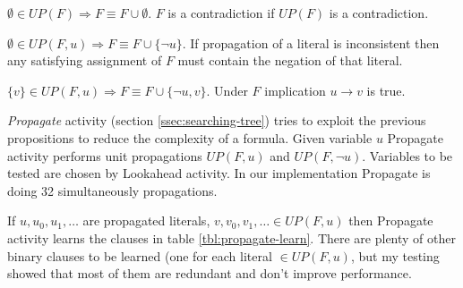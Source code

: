 \begin{myprop}
  $\emptyset \in UP(F) \Rightarrow F \equiv F \cup \emptyset$. $F$ is a
  contradiction if $UP(F)$ is a contradiction.
\end{myprop}

\begin{myprop}
  $\emptyset \in UP(F, u) \Rightarrow F \equiv F \cup \{\neg u\}$. If propagation
  of a literal is inconsistent then any satisfying assignment of $F$
  must contain the negation of that literal.
\end{myprop}

\begin{myprop}
  $\{ v \} \in UP(F, u) \Rightarrow F \equiv F \cup \{\neg u, v\}$. Under $F$
  implication $u \rightarrow v$ is true.
\end{myprop}

\emph{Propagate} activity (section \ref{ssec:searching-tree}) tries to exploit
the previous propositions to reduce the complexity of a formula.
Given variable $u$ Propagate activity performs unit propagations $UP(F, u)$
and $UP(F, \neg u)$. Variables to be tested are chosen by Lookahead
activity. In our implementation Propagate is doing 32 simultaneously
propagations. 

If $u, u_0, u_1, \ldots$ are propagated literals, $v, v_0, v_1,
\ldots \in UP(F, u)$ then Propagate activity learns the clauses in table
\ref{tbl:propagate-learn}. There are plenty of other binary clauses
to be learned (one for each literal $\in UP(F, u)$, but my testing
showed that most of them are redundant and don't improve performance.

\begin{table}[h]
  \centering
  \caption{Learned units and binaries by Propagate activity}
  \label{tbl:propagate-learn}
\end{table}


